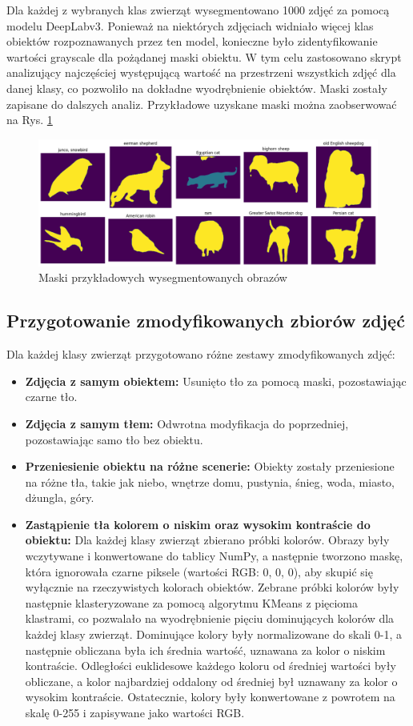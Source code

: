 Dla każdej z wybranych klas zwierząt wysegmentowano 1000 zdjęć za pomocą modelu DeepLabv3. Ponieważ na niektórych 
zdjęciach widniało więcej klas obiektów rozpoznawanych przez ten model, konieczne było zidentyfikowanie wartości grayscale dla pożądanej maski 
obiektu. W tym celu zastosowano skrypt analizujący najczęściej występującą wartość na przestrzeni wszystkich zdjęć 
dla danej klasy, co pozwoliło na dokładne wyodrębnienie obiektów. Maski zostały zapisane do dalszych analiz. Przykładowe uzyskane
maski można zaobserwować na Rys. \ref{rys:masks}

\begin{figure}
	\centering\includegraphics[width=.9\textwidth]{img/masks}
	\caption{Maski przykładowych wysegmentowanych obrazów}  \label{rys:masks}
\end{figure}

\subsection*{Przygotowanie zmodyfikowanych zbiorów zdjęć}

Dla każdej klasy zwierząt przygotowano różne zestawy zmodyfikowanych zdjęć:
\begin{itemize}
    \item \textbf{Zdjęcia z samym obiektem:} Usunięto tło za pomocą maski, pozostawiając czarne tło.
    \item \textbf{Zdjęcia z samym tłem:} Odwrotna modyfikacja do poprzedniej, pozostawiając samo tło bez obiektu.
    \item \textbf{Przeniesienie obiektu na różne scenerie:} Obiekty zostały przeniesione na różne tła, takie jak niebo, 
    wnętrze domu, pustynia, śnieg, woda, miasto, dżungla, góry.
    \item \textbf{Zastąpienie tła kolorem o niskim oraz wysokim kontraście do obiektu:} Dla każdej klasy zwierząt zbierano próbki kolorów. 
    Obrazy były wczytywane i konwertowane do tablicy NumPy, a następnie tworzono maskę, która ignorowała czarne piksele 
    (wartości RGB: 0, 0, 0), aby skupić się wyłącznie na rzeczywistych kolorach obiektów. Zebrane próbki kolorów były następnie 
    klasteryzowane za pomocą algorytmu KMeans z pięcioma klastrami, co pozwalało na wyodrębnienie pięciu dominujących kolorów dla 
    każdej klasy zwierząt. Dominujące kolory były normalizowane do skali 0-1, a następnie obliczana była ich średnia wartość, 
    uznawana za kolor o niskim kontraście. Odległości euklidesowe każdego koloru od średniej wartości były obliczane, a kolor 
    najbardziej oddalony od średniej był uznawany za kolor o wysokim kontraście. Ostatecznie, kolory były konwertowane z powrotem 
    na skalę 0-255 i zapisywane jako wartości RGB. 
\end{itemize}

